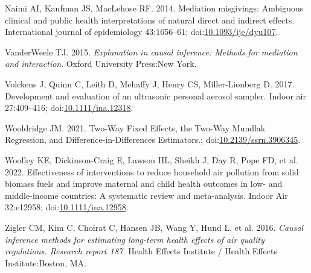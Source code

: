 \documentclass[
  letterpaper,
  DIV=11,
  numbers=noendperiod]{scrartcl}
\newlength{\cslhangindent}
\newenvironment{CSLReferences}[2] %
 {\begin{list}{}{%
  \setlength{\itemindent}{0pt}
  \setlength{\leftmargin}{0pt}
  \setlength{\parsep}{0pt}
  \ifodd #1
   \setlength{\leftmargin}{\cslhangindent}
   \setlength{\itemindent}{-1\cslhangindent}
  \fi
  \setlength{\itemsep}{#2\baselineskip}}}
 {\end{list}}
\begin{document}
\begin{CSLReferences}{1}{1}
Naimi AI, Kaufman JS, MacLehose RF. 2014. Mediation misgivings:
Ambiguous clinical and public health interpretations of natural direct
and indirect effects. International journal of epidemiology 43:1656--61;
doi:\href{https://doi.org/10.1093/ije/dyu107}{10.1093/ije/dyu107}.

VanderWeele TJ. 2015. \emph{Explanation in causal inference: Methods for
mediation and interaction}. {Oxford University Press}:{New York}.

Volckens J, Quinn C, Leith D, Mehaffy J, Henry CS, Miller-Lionberg D.
2017. Development and evaluation of an ultrasonic personal aerosol
sampler. Indoor air 27:409--416;
doi:\href{https://doi.org/10.1111/ina.12318}{10.1111/ina.12318}.

Wooldridge JM. 2021. Two-{Way Fixed Effects}, the {Two-Way Mundlak
Regression}, and {Difference-in-Differences Estimators}.;
doi:\href{https://doi.org/10.2139/ssrn.3906345}{10.2139/ssrn.3906345}.

Woolley KE, Dickinson-Craig E, Lawson HL, Sheikh J, Day R, Pope FD, et
al. 2022. Effectiveness of interventions to reduce household air
pollution from solid biomass fuels and improve maternal and child health
outcomes in low- and middle-income countries: {A} systematic review and
meta-analysis. Indoor Air 32:e12958;
doi:\href{https://doi.org/10.1111/ina.12958}{10.1111/ina.12958}.

Zigler CM, Kim C, Choirat C, Hansen JB, Wang Y, Hund L, et al. 2016.
\emph{Causal inference methods for estimating long-term health effects
of air quality regulations. {Research} report 187.} {Health Effects
Institute / Health Effects Institute}:{Boston, MA}.

\end{CSLReferences}
\end{document}
